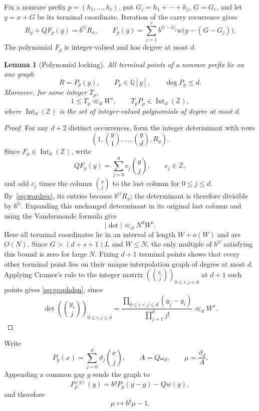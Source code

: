 \documentclass[a4paper,10pt]{amsart}
\newtheorem{lemma}[theorem]{Lemma}
\theoremstyle{remark}
\newcommand{\Q}{\mathbb Q}
\newcommand{\Z}{\mathbb Z}
\newcommand{\Int}{\operatorname{Int}}
\begin{document}
Fix a nonrare prefix $p=(h_1,\ldots,h_r)$, put
$G_j=h_1+\cdots+h_j$, $G=G_r$, and let $y=x+G$ be its terminal coordinate.
Iteration of the carry recurrence gives
\begin{equation}\label{eq:wordrec}
 R_y+QF_p(y)=b^GR_x,\qquad
 F_p(y)=\sum_{j=1}^rb^{G-G_j}w\bigl(y-(G-G_j)\bigr).
\end{equation}
The polynomial $F_p$ is integer-valued and has degree at most $d$.

\begin{lemma}[Polynomial locking]\label{lem:locking}
All terminal points of a nonrare prefix lie on one graph
\[
 R=P_p(y),\qquad P_p\in\Q[y],\qquad \deg P_p\le d.
\]
Moreover, for some integer $T_p$,
\begin{equation}\label{eq:graphden}
 1\le T_p\ll_d W^s,\qquad
 T_pP_p\in\Int_d(\Z),
\end{equation}
where $\Int_d(\Z)$ is the set of integer-valued polynomials of degree at
most $d$.
\end{lemma}

\begin{proof}
For any $d+2$ distinct occurrences, form the integer determinant with rows
\[
 \left(1,\binom y1,\ldots,\binom yd,R_y\right).
\]
Since $F_p\in\Int_d(\Z)$, write
\[
 QF_p(y)=\sum_{j=0}^dc_j\binom yj,\qquad c_j\in\Z,
\]
and add $c_j$ times the column $\binom yj$ to the last column for
$0\le j\le d$. By~\eqref{eq:wordrec}, its entries become $b^GR_x$; the
determinant is therefore divisible by $b^G$. Expanding this unchanged
determinant in its original last column and using the Vandermonde formula give
\[
 |\det|\ll_d N^dW^s.
\]
Here all terminal coordinates lie in an interval of length $W+o(W)$ and are
$O(N)$. Since $G>(d+s+1)L$ and $W\le N$, the only multiple of $b^G$ satisfying
this bound is zero for large $N$. Fixing $d+1$ terminal points shows that every
other terminal point lies on their unique interpolation graph of degree at
most $d$. Applying Cramer's rule to the integer matrix
$(\binom{y_i}{j})_{0\le i,j\le d}$ at $d+1$ such points gives
\eqref{eq:graphden}, since
\[
 \det\left(\binom{y_i}{j}\right)_{0\le i,j\le d}
 =\frac{\prod_{0\le i<j\le d}(y_j-y_i)}{\prod_{j=1}^d j!}
 \ll_d W^s.
\]
\end{proof}

Write
\[
 P_p(x)=\sum_{j=0}^d\vartheta_j\binom xj,\qquad
 A=Q\omega_d,\qquad \mu=\frac{\vartheta_d}{A}.
\]
Appending a common gap $g$ sends the graph to
\[
 P_p^{(g)}(y)=b^gP_p(y-g)-Qw(y),
\]
and therefore
\begin{equation}\label{eq:topmap}
 \mu\longmapsto b^g\mu-1.
\end{equation}
\end{document}

